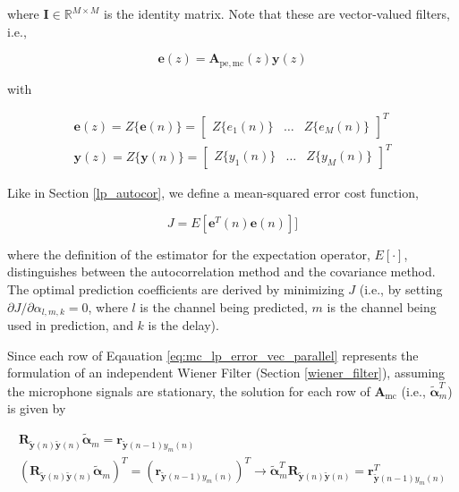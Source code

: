\noindent
where $\boldsymbol{I} \in \mathbb{R}^{M \times M}$ is the identity matrix. Note that these are vector-valued filters, i.e., 

\begin{equation}
	\boldsymbol{e}(z) = \boldsymbol{A}_{\mathrm{pe,mc}}(z) \boldsymbol{y}(z)
\end{equation}

\noindent
with 

\noindent
\begin{eqnarray}
	\boldsymbol{e}(z) = Z\{\boldsymbol{e}(n)\} = \begin{bmatrix} Z\{e_1(n)\} & \dots & Z\{e_M(n)\} \end{bmatrix}^T\\
	\boldsymbol{y}(z) = Z\{\boldsymbol{y}(n)\} = \begin{bmatrix} Z\{y_1(n)\} & \dots & Z\{y_M(n)\} \end{bmatrix}^T
\end{eqnarray}

Like in Section \ref{lp_autocor}, we define a mean-squared error cost function, 

\begin{equation}
	J = E[\boldsymbol{e}^T(n)\boldsymbol{e}(n)]]
\end{equation}

\noindent
where the definition of the estimator for the expectation operator, $E[\cdot]$, distinguishes between the autocorrelation method and the covariance method. The optimal prediction coefficients are derived by minimizing $J$ (i.e., by setting $\partial J/\partial \alpha_{l,m,k}=0$, where $l$ is the channel being predicted, $m$ is the channel being used in prediction, and $k$ is the delay). 

Since each row of Eqauation \ref{eq:mc_lp_error_vec_parallel} represents the formulation of an independent Wiener Filter (Section \ref{wiener_filter}), assuming the microphone signals are stationary, the solution for each row of $\boldsymbol{A}_{\mathrm{mc}}$ (i.e., $\boldsymbol{\tilde{\alpha}}^T_m$) is given by

\begin{eqnarray}
	\boldsymbol{R}_{\boldsymbol{\tilde{y}}(n)\boldsymbol{\tilde{y}}(n)} \boldsymbol{\tilde{\alpha}}_m =
	\boldsymbol{r}_{\boldsymbol{\tilde{y}}(n-1)y_m(n)}  \\
	(\boldsymbol{R}_{\boldsymbol{\tilde{y}}(n)\boldsymbol{\tilde{y}}(n)} \boldsymbol{\tilde{\alpha}}_m)^T =
	(\boldsymbol{r}_{\boldsymbol{\tilde{y}}(n-1)y_m(n)})^T \rightarrow
	\boldsymbol{\tilde{\alpha}}^T_m  \boldsymbol{R}_{\boldsymbol{\tilde{y}}(n)\boldsymbol{\tilde{y}}(n)} =  \boldsymbol{r}^T_{\boldsymbol{\tilde{y}}(n-1)y_m(n)} %
\end{eqnarray}

